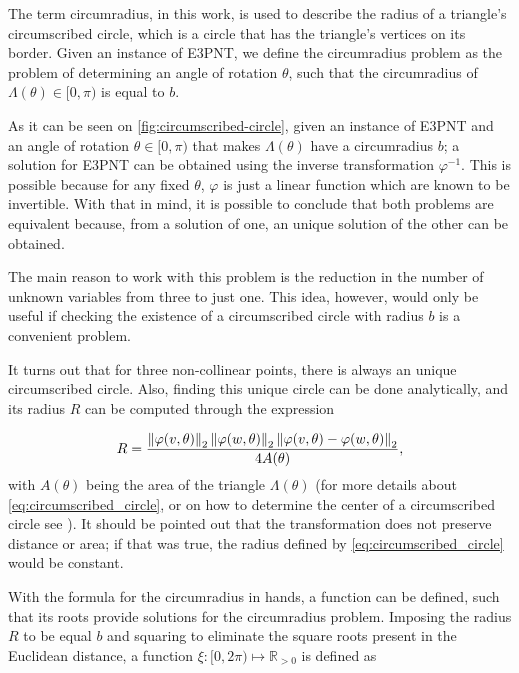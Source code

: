 The term circumradius, in this work, is used to describe the radius of a triangle's circumscribed circle, which is a circle that has the triangle's vertices on its border. Given an instance of E3PNT, we define the circumradius problem as the problem of determining an angle of rotation $\theta$, such that the circumradius of $\Lambda(\theta)\in[0, \pi)$ is equal to $b$.

As it can be seen on \autoref{fig:circumscribed-circle}, given an instance of E3PNT and an angle of rotation $\theta\in[0, \pi)$ that makes $\Lambda(\theta)$ have a circumradius $b$; a solution for E3PNT can be obtained using the inverse transformation $\varphi^{-1}$. This is possible because for any fixed $\theta$, $\varphi$ is just a linear function which are known to be invertible.
With that in mind, it is possible to conclude that both problems are equivalent because, from a solution of one, an unique solution of the other can be obtained.

The main reason to work with this problem is the reduction in the number of unknown variables from three to just one. This idea, however, would only be useful if checking the existence of a circumscribed circle with radius $b$ is a convenient problem.

It turns out that for three non-collinear points, there is always an unique circumscribed circle. Also, finding this unique circle can be done analytically, and its radius $R$ can be computed through the expression

\begin{equation}\label{eq:circumscribed_circle}
R = \dfrac{\left\lVert\varphi(v, \theta)\right\rVert_{2}\left\lVert\varphi(w, \theta)\right\rVert_{2}\left\lVert\varphi(v, \theta)-\varphi(w, \theta)\right\rVert_{2}   }{4A(\theta)},
\end{equation}
with $A(\theta)$ being the area of the triangle $\Lambda(\theta)$ (for more details about \autoref{eq:circumscribed_circle}, or on how to determine the center of a circumscribed circle see 
). It should be pointed out that the transformation does not preserve distance or area; if that was true, the radius defined by \autoref{eq:circumscribed_circle} would be constant.

With the formula for the circumradius in hands, a function can be defined, such that its roots provide solutions for the circumradius problem.
Imposing the radius $R$ to be equal $b$ and squaring to eliminate the square roots present in the Euclidean distance, a function $\xi : [0, 2\pi) \mapsto \mathbb{R}_{>0}$ is defined as 

